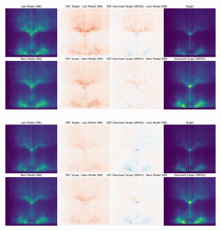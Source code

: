 \begin{figure}[h]
    \centering
    \includegraphics[width=1\linewidth]{images/nn_diff_plots_2M.pdf}
    \caption{}
    \label{fig:nn_diff_plots_2M}
\end{figure}

\begin{figure}[h]
    \centering
    \includegraphics[width=1\linewidth]{images/nn_diff_plots_8M.pdf}
    \caption{}
    \label{fig:nn_diff_plots_8M}
\end{figure}




